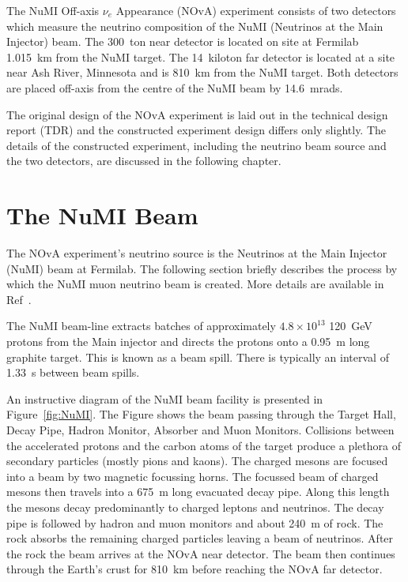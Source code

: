 
The NuMI Off-axis $\nu_e$ Appearance (NOvA) experiment consists of two 
detectors which measure the neutrino composition of the NuMI
(Neutrinos at the Main Injector) beam. The
300~ton near detector is located on site at Fermilab 1.015~km 
from the NuMI
target. The 14~kiloton far detector is located at a site near Ash
River, Minnesota and is 810~km from the
NuMI target. Both detectors are placed off-axis from the centre
of the NuMI beam by 14.6~mrads.

The original design of the NOvA experiment is laid out in the
technical design report (TDR) \cite{TDR} and the constructed experiment
design differs only slightly. The details
of the constructed experiment, including the neutrino beam source and
the two detectors, are discussed in the following chapter.


\section{The NuMI Beam}

The NOvA experiment's neutrino source is the Neutrinos at
the Main Injector (NuMI) beam at Fermilab. The following section
briefly describes the process by which the NuMI muon neutrino beam is
created. More details are available in Ref~\cite{NuMI}.

The NuMI beam-line extracts batches of approximately $4.8 \times
10^{13}$ 120~GeV protons from the Main
injector and directs the protons onto a 0.95~m long graphite
target. This is known as a beam spill. There is typically an
interval of 1.33~s between beam spills.

An instructive diagram of the NuMI beam facility is presented in
Figure~\ref{fig:NuMI}. The Figure shows the beam passing through the 
Target Hall, Decay Pipe, Hadron Monitor, Absorber and Muon Monitors. 
Collisions between the accelerated protons and the carbon atoms of the
target produce a plethora of secondary particles (mostly pions and
kaons). The charged mesons are focused into a beam by two magnetic
focussing horns. The focussed beam of charged mesons then travels
into a 675~m long evacuated decay pipe. Along this length the
mesons decay predominantly to charged leptons and neutrinos. 
The decay pipe is followed by hadron and muon
monitors and about 240~m of rock. The rock absorbs the remaining
charged particles leaving a beam of neutrinos. After the rock the beam
arrives at the NOvA near detector. The beam then continues through the
Earth's crust for 810~km before reaching the NOvA far detector.

